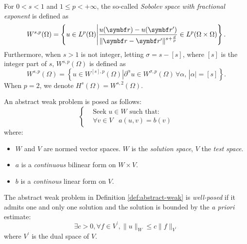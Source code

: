 \begin{defin}
For $0 < s < 1$ and $1 \leq p < +\infty$, the so-called \emph{Sobolev space with fractional
exponent} is defined as
\begin{equation}
W^{s, p}(\Omega) =
\left\lbrace
u \in L^p(\Omega) \Bigg|
\frac{u(\vect{r}) - u(\vect{r}^\prime)}{\| \vect{r} - \vect{r}^\prime\|^{s+\frac{d}{p}}}
\in L^p(\Omega \times \Omega)
\right\rbrace.
\end{equation}
Furthermore, when $s> 1$ is not integer, letting $\sigma = s - [s]$, where $[s]$ is the integer
part of $s$, $W^{s,p}(\Omega)$ is defined as
\begin{equation*}
W^{s, p}(\Omega) =
\left\lbrace
u \in W^{[s], p}(\Omega) |
\partial^\alpha u \in W^{\sigma, p}(\Omega)\, \forall \alpha,\, |\alpha| = [s]
\right\rbrace.
\end{equation*}
When $p=2$, we denote $H^s(\Omega) = W^{s,2}(\Omega)$.
\end{defin}

\begin{defin}\label{def:abstract-weak}
An abstract weak problem is posed as follows:
\begin{equation}
  \left\{
  \begin{aligned}
    &\text{Seek $u \in W$ such that:}\\
    &\forall v \in V \,\,\,\,\,
    a(u, v) = b(v)
  \end{aligned}
  \right.
  \label{eq:weak}
\end{equation}
where:
\begin{itemize}
  \item $W$ and $V$ are normed vector spaces. $W$ is the \emph{solution space},
  $V$ the \emph{test space}.
  \item $a$ is a \emph{continuous} bilinear form on $W \times V$.
  \item $b$ is a \emph{continous} linear form on $V$.
\end{itemize}
\end{defin}

\begin{defin}\label{def:hadamard}
The abstract weak problem in Definition \ref{def:abstract-weak} is
\emph{well-posed} if it admits one and only one solution and the solution is
bounded by the \emph{a priori} estimate:
\begin{equation}
\exists c > 0, \forall f \in V^\prime, \|u\|_W \leq c \|f\|_{V^\prime}
\end{equation}
where $V^\prime$ is the dual space of $V$.
\end{defin}

